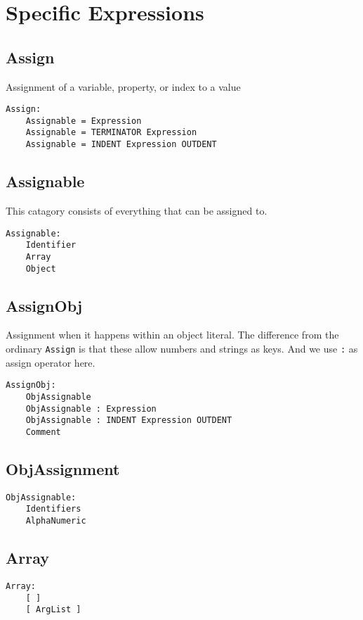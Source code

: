 \documentclass[10pt]{report}
\begin{document}
\section{Specific Expressions}

\subsection{Assign}
Assignment of a variable, property, or index to a value
\begin{verbatim}
Assign:
    Assignable = Expression
    Assignable = TERMINATOR Expression
    Assignable = INDENT Expression OUTDENT
\end{verbatim}


\subsection{Assignable}
This catagory consists of everything that can be assigned to.
\begin{verbatim}
Assignable:
    Identifier
    Array
    Object
\end{verbatim}


\subsection{AssignObj}

Assignment when it happens within an object literal. The difference from the ordinary \texttt{Assign} is that these allow numbers and strings as keys. And we use \texttt{:} as assign operator here.
\begin{verbatim}
AssignObj:
    ObjAssignable
    ObjAssignable : Expression
    ObjAssignable : INDENT Expression OUTDENT
    Comment
\end{verbatim}

\subsection{ObjAssignment}
\begin{verbatim}
ObjAssignable:
    Identifiers
    AlphaNumeric
\end{verbatim}

\subsection{Array}

\begin{verbatim}
Array:
    [ ]
    [ ArgList ]
\end{verbatim}
\end{document}
